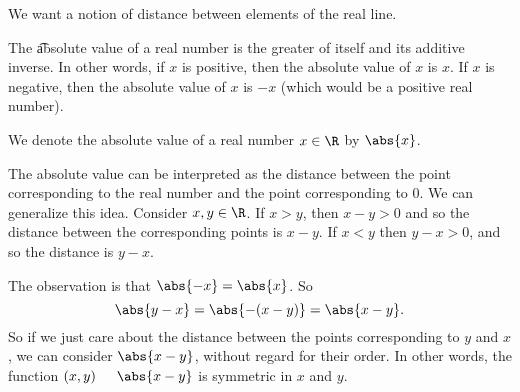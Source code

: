 

We want a notion of distance between elements of the real line.


The \t{absolute value} of a real number is the greater of itself and its additive inverse.
In other words, if $x$ is positive, then the absolute value of $x$ is $x$.
If $x$ is negative, then the absolute value of $x$ is $-x$ (which would be a positive real number).


We denote the absolute value of a real number $x \in \R $ by $\abs{x}$.


The absolute value can be interpreted as the distance between the point corresponding to the real number and the point corresponding to 0.
We can generalize this idea.
Consider $x, y \in \R $.
If $x > y$, then $x - y > 0$ and so the distance between the corresponding points is $x - y$.
If $x < y$ then $y - x > 0$, and so the distance is $y - x$.

The observation is that $\abs{-x} = \abs{x}$.
So
  \[
\abs{y - x} = \abs{-(x - y)} = \abs{x-y}.
  \]
So if we just care about the distance between the points corresponding to $y$ and $x$, we can consider $\abs{x - y}$, without regard for their order.
In other words, the function $(x, y) \indent \abs{x - y}$ is symmetric in $x$ and $y$.

\blankpage
